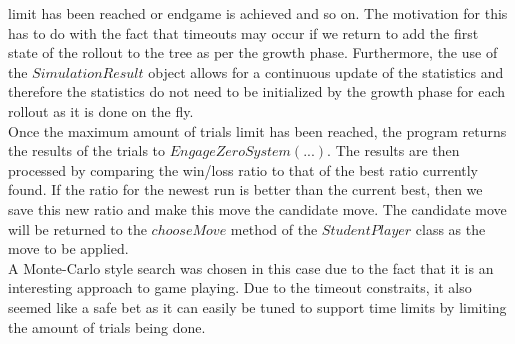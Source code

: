 \documentclass[12pt]{article} %
\begin{document}
limit has been reached or endgame is achieved and so on. The motivation for this has to do with the fact that timeouts may occur if we return to add the first state of the rollout 
to the tree as per the growth phase. Furthermore, the use of the $SimulationResult$ object allows for a continuous update of the statistics and therefore the statistics do not need 
to be initialized by the growth phase for each rollout as it is done on the fly. 
\\ Once the maximum amount of trials limit has been reached, the program returns the results of the trials to $EngageZeroSystem(...)$. The results are then 
processed by comparing the win/loss ratio to that of the best ratio currently found. If the ratio for the newest run is better than the current best, then we 
save this new ratio and make this move the candidate move. The candidate move will be returned to the $chooseMove$ method of the $StudentPlayer$ class as the 
move to be applied.
\\ A Monte-Carlo style search was chosen in this case due to the fact that it is an interesting approach to game playing. Due to the timeout constraits, it also seemed 
like a safe bet as it can easily be tuned to support time limits by limiting the amount of trials being done. 
\end{document}

